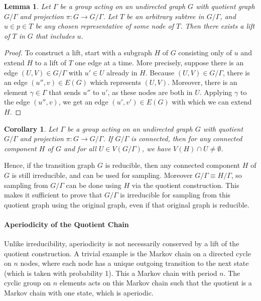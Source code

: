 \documentclass{article}
\newtheorem{lemma}{Lemma}
\newtheorem{corollary}{Corollary}
\theoremstyle{definition}
\begin{document}
\begin{lemma}
    Let $\Gamma$ be a group acting on an undirected graph $G$ with quotient graph $G/\Gamma$ and projection $\pi: G \to G/\Gamma$. Let $T$ be an arbitrary subtree in $G/\Gamma$, and $u\in p\in T$ be any chosen representative of some node of $T$. Then there exists a lift of $T$ in $G$ that includes $u$.
\end{lemma}
\begin{proof}
    To construct a lift, start with a subgraph $H$ of $G$ consisting only of $u$ and extend $H$ to a lift of $T$ one edge at a time. More precisely, suppose there is an edge $(U,V)\in G/\Gamma$ with $u'\in U$ already in $H$. Because $(U,V)\in G/\Gamma$, there is an edge $(u'',v)\in E(G)$ which represents $(U,V)$. Moreover, there is an element $\gamma \in \Gamma$ that sends $u''$ to $u'$, as these nodes are both in $U$. Applying $\gamma$ to the edge $(u'',v)$, we get an edge $(u',v')\in E(G)$ with which we can extend $H$.   
\end{proof}

\begin{corollary}
    Let $\Gamma$ be a group acting on an undirected graph $G$ with quotient $G/\Gamma$ and projection $\pi: G \to G/\Gamma$. If $G/\Gamma$ is connected, then for any connected component $H$ of $G$ and for all $U\in V(G/\Gamma)$, we have $V(H)\cap U \neq \emptyset$.
\end{corollary}

Hence, if the transition graph $G$ is reducible, then any connected component $H$ of $G$ is still irreducible, and can be used for sampling. Moreover $G/\Gamma \equiv H/\Gamma$, so sampling from $G/\Gamma$ can be done using $H$ via the quotient construction. This makes it sufficient to prove that $G/\Gamma$ is irreducible for sampling from this quotient graph using the original graph, even if that original graph is reducible.


\paragraph{Aperiodicity of the Quotient Chain}
Unlike irreducibility, aperiodicity is not necessarily conserved by a lift of the quotient construction. A trivial example is the Markov chain on a directed cycle on $n$ nodes, where each node has a unique outgoing transition to the next state (which is taken with probability 1). This a Markov chain with period $n$. The cyclic group on $n$ elements acts on this Markov chain such that the quotient is a Markov chain with one state, which is aperiodic. 
\end{document}
